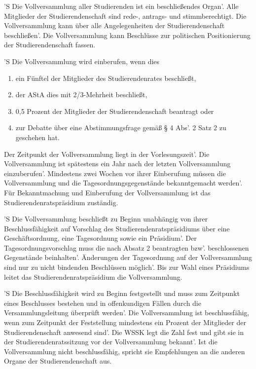 \documentclass[fontsize=12pt,parskip=half]{scrartcl}
\begin{document}
\begin{contract}

  'S Die Vollversammlung aller Studierenden ist ein beschließendes Organ'. Alle
  Mitglieder der Studierendenschaft sind rede-, antrags- und stimmberechtigt.
  Die Vollversammlung kann über alle Angelegenheiten der Studierendenschaft
  beschließen'. Die Vollversammlung kann Beschlüsse zur politischen
  Positionierung der Studierendenschaft fassen.

  'S Die Vollversammlung wird einberufen, wenn dies
  \begin{enumerate}[\qquad 1.]
  \item ein Fünftel der Mitglieder des Studierendenrates beschließt,
  \item der AStA dies mit 2/3-Mehrheit beschließt,
  \item 0,5 Prozent der Mitglieder der Studierendenschaft beantragt oder
  \item zur Debatte über eine Abstimmungsfrage gemäß § 4 Abs'. 2 Satz 2 zu
    geschehen hat.
  \end{enumerate}
  Der Zeitpunkt der Vollversammlung liegt in der Vorlesungszeit'. Die
  Vollversammlung ist spätestens ein Jahr nach der letzten Vollversammlung
  einzuberufen'. Mindestens zwei Wochen vor ihrer Einberufung müssen die
  Vollversammlung und die Tagesordnungsgegenstände bekanntgemacht werden'. Für
  Bekanntmachung und Einberufung der Vollversammlung ist das
  Studierendenratspräsidium zuständig.

  'S Die Vollversammlung beschließt zu Beginn unabhängig von ihrer
  Beschlussfähigkeit auf Vorschlag des Studierendenratspräsidiums über eine
  Geschäftsordnung, eine Tagesordnung sowie ein Präsidium'. Der
  Tagesordnungsvorschlag muss die nach Absatz 2 beantragten bzw'. beschlossenen
  Gegenstände beinhalten'. Änderungen der Tagesordnung auf der Vollversammlung
  sind nur zu nicht bindenden Beschlüssen möglich'. Bis zur Wahl eines Präsidiums
  leitet das Studierendenratspräsidium die Vollversammlung.

  'S Die Beschlussfähigkeit wird zu Beginn festgestellt und muss zum Zeitpunkt
  eines Beschlusses bestehen und in offenkundigen Fällen durch die
  Versammlungsleitung überprüft werden'. Die Vollversammlung ist beschlussfähig,
  wenn zum Zeitpunkt der Feststellung mindestens ein Prozent der Mitglieder der
  Studierendenschaft anwesend sind'. Die WSSK legt die Zahl fest und gibt sie in
  der Studierendenratssitzung vor der Vollversammlung bekannt'. Ist die
  Vollversammlung nicht beschlussfähig, spricht sie Empfehlungen an die anderen
  Organe der Studierendenschaft aus.


\end{contract}
\end{document}
